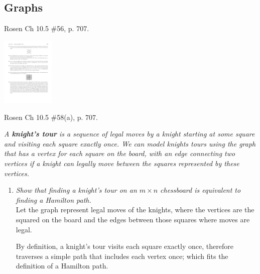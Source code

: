 \begin{questions}


\section*{Graphs}

 Rosen Ch 10.5 \#56, p. 707.
  \ifprintanswers
        \vspace{-10pt}
  \fi
  \begin{solution}
    \includegraphics[width=1in]{figs/rosen_10_5_56}
  \end{solution}


  \ifprintanswers
        \vspace{-10pt}
  \fi
{} Rosen Ch 10.5 \#58(a), p. 707.
  \ifprintanswers
        \vspace{-10pt}
  \fi
  \begin{solution}
  \textit{A \textbf{knight’s tour} is a sequence of legal moves by a knight starting at some square and visiting each square exactly once. We can model knights tours using the graph that has a vertex for each square on the board, with an edge connecting two vertices if a knight can legally move between the squares represented by these vertices.}

  \begin{enumerate}[label=(\alph*),itemsep=0pt,parsep=0pt,topsep=0pt,partopsep=0pt]
    \item \textit{Show that finding a knight’s tour on an $m \times n$ chessboard is equivalent to finding a Hamilton path.} \\
    Let the graph represent legal moves of the knights, where the vertices are the squared on the board and the edges between those squares where moves are legal. 

    By definition, a knight’s tour visits each square exactly once, therefore traverses a simple path that includes each vertex once; which fits the definition of a Hamilton path. 



\end{enumerate}
\end{solution}
\end{questions}
